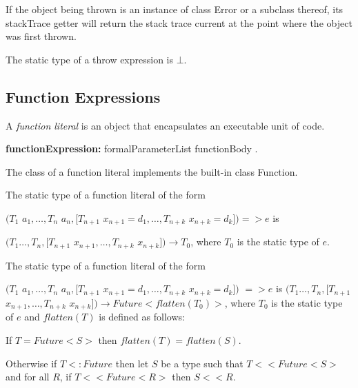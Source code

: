 \documentclass{article}
\newcommand{\code}[1]{{\sf #1}}
\begin{document}
\LMHash{}
If the object being thrown is an instance of class \code{Error} or a subclass thereof, its \code{stackTrace} getter will return the stack trace current at the point where the object was first thrown.

\LMHash{}
The static type of a throw expression is $\bot$.


\subsection{ Function Expressions}

\LMHash{}
A {\em function literal} is an object that encapsulates an executable unit of code.

\begin{grammar}
{\bf functionExpression:}
    formalParameterList functionBody
    .
 \end{grammar}

\LMHash{}
The class of a function literal implements the built-in class \code{Function}.



\LMHash{}
The static type of a function literal of the form

$(T_1$ $a_1, \ldots, T_n$ $a_n, [T_{n+1}$ $x_{n+1} = d_1, \ldots,  T_{n+k}$ $x_{n+k} = d_k]) => e$
is

$(T_1 \ldots, T_n, [T_{n+1}$ $x_{n+1}, \ldots, T_{n+k}$ $x_{n+k}]) \rightarrow T_0$, where $T_0$ is the static type of $e$.

\LMHash{}
The static type of a function literal of the form

$(T_1$ $a_1, \ldots, T_n$ $a_n, [T_{n+1}$ $x_{n+1} = d_1, \ldots,  T_{n+k}$ $x_{n+k} = d_k])$ \ASYNC{} $=> e$
is $(T_1 \ldots, T_n, [T_{n+1}$ $x_{n+1}, \ldots, T_{n+k}$ $x_{n+k}]) \rightarrow Future<flatten(T_0)>$, where $T_0$ is the static type of $e$ and  $flatten(T)$ is defined as follows:

 If $T = Future<S>$ then $flatten(T) = flatten(S)$.

 Otherwise if $T <: Future$ then let $S$ be a type such that $T << Future<S>$ and for all $R$, if $T << Future<R>$ then $S << R$.

\end{document}
